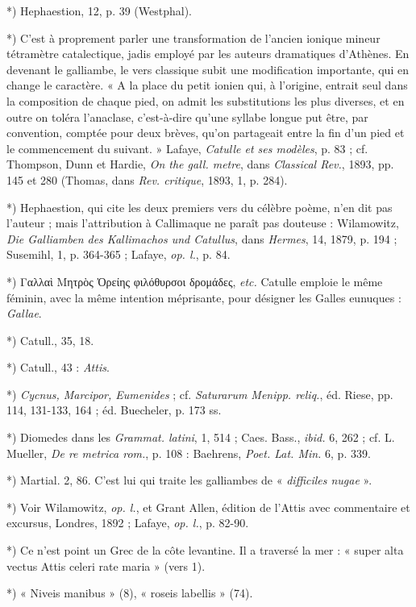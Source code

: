\documentclass[a4paper, 11pt, oneside, polutonikogreek, french]{article}
\begin{document}
*) Hephaestion, 12, p. 39 (Westphal).

*) C'est à proprement parler une transformation de l'ancien ionique mineur tétramètre catalectique, jadis employé par les auteurs dramatiques d'Athènes. En devenant le galliambe, le vers classique subit une modification importante, qui en change le caractère. « A la place du petit ionien qui, à l'origine, entrait seul dans la composition de chaque pied, on admit les substitutions les plus diverses, et en outre on toléra l'anaclase, c'est-à-dire qu'une syllabe longue put être, par convention, comptée pour deux brèves, qu'on partageait entre la fin d'un pied et le commencement du suivant. » Lafaye, \emph{Catulle et ses modèles}, p. 83 ; cf. Thompson, Dunn et Hardie, \emph{On the gall. metre}, dans \emph{Classical Rev.}, 1893, pp. 145 et 280 (Thomas, dans \emph{Rev. critique}, 1893, 1, p. 284).

*) Hephaestion, qui cite les deux premiers vers du célèbre poème, n'en dit pas l'auteur ; mais l'attribution à Callimaque ne paraît pas douteuse : Wilamowitz, \emph{Die Galliamben des Kallimachos und Catullus}, dans \emph{Hermes}, 14, 1879, p. 194 ; Susemihl, 1, p. 364-365 ; Lafaye, \emph{op. l.}, p. 84.

*) Γαλλαὶ Μητρὸς Ὀρείης φιλόθυρσοι δρομάδες, \emph{etc.} Catulle emploie le même féminin, avec la même intention méprisante, pour désigner les Galles eunuques : \emph{Gallae}.

*) Catull., 35, 18.

*) Catull., 43 : \emph{Attis}.

*) \emph{Cycnus, Marcipor, Eumenides} ; cf. \emph{Saturarum Menipp. reliq.}, éd. Riese, pp. 114, 131-133, 164 ; éd. Buecheler, p. 173 ss.

*) Diomedes dans les \emph{Grammat. latini}, 1, 514 ; Caes. Bass., \emph{ibid.} 6, 262 ; cf. L. Mueller, \emph{De re metrica rom.}, p. 108 : Baehrens, \emph{Poet. Lat. Min.} 6, p. 339.

*) Martial. 2, 86. C'est lui qui traite les galliambes de « \emph{difficiles nugae} ».

*) Voir Wilamowitz, \emph{op. l.}, et Grant Allen, édition de l'Attis avec commentaire et excursus, Londres, 1892 ; Lafaye, \emph{op. l.}, p. 82-90.

*) Ce n'est point un Grec de la côte levantine. Il a traversé la mer : « super alta vectus Attis celeri rate maria » (vers 1).

*) « Niveis manibus » (8), « roseis labellis » (74).
\end{document}
